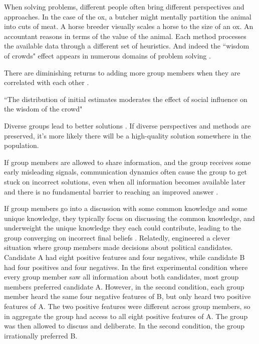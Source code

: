 When solving problems, different people often bring different perspectives and approaches. In the case of the ox, a butcher might mentally partition the animal into cuts of meat. A horse breeder visually scales a horse to the size of an ox. An accountant reasons in terms of the value of the animal. Each method processes the available data through a different set of heuristics. And indeed the ``wisdom of crowds" effect appears in numerous domains of problem solving \citep{surowiecki2005wisdom}.

There are diminishing returns to adding more group members when they are correlated with each other \citep{hogarth1978note}.

``The distribution of initial estimates moderates the effect of social influence on the wisdom of the crowd" \citep{almaatouq2022distribution} 

Diverse groups lead to better solutions \citep{hong2004groups, gomez2019clustering}. If diverse perspectives and methods are preserved, it's more likely there will be a high-quality solution somewhere in the population. 

If group members are allowed to share information, and the group receives some early misleading signals, communication dynamics often cause the group to get stuck on incorrect solutions, even when all information becomes available later and there is no fundamental barrier to reaching an improved answer \citep{anderson1997information}. 

If group members go into a discussion with some common knowledge and some unique knowledge, they typically focus on discussing the common knowledge, and underweight the unique knowledge they each could contribute, leading to the group converging on incorrect final beliefs \citep{stasser1985pooling}.
Relatedly, \cite{stasser1985pooling} engineered a clever situation where group members made decisions about political candidates. Candidate A had eight positive features and four negatives, while candidate B had four positives and four negatives. In the first experimental condition where every group member saw all information about both candidates, most group members preferred candidate A. However, in the second condition, each group member heard the same four negative features of B, but only heard two positive features of A. The two positive features were different across group members, so in aggregate the group had access to all eight positive features of A. The group was then allowed to discuss and deliberate. In the second condition, the group irrationally preferred B. 

